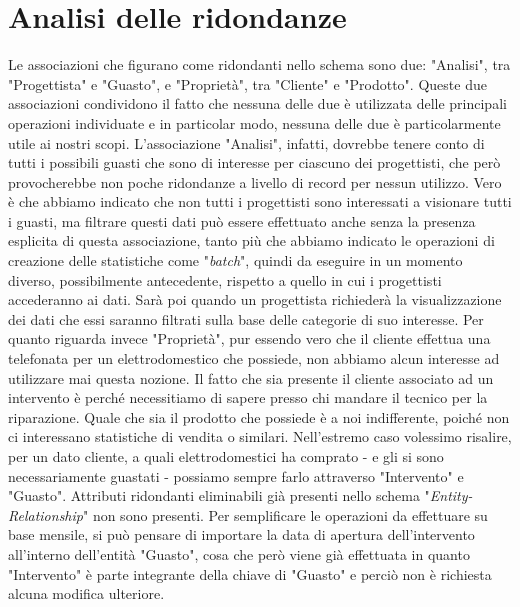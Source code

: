 \documentclass[a4paper, 12pt]{report}
\begin{document}
\section{Analisi delle ridondanze}

Le associazioni che figurano come ridondanti nello schema sono due: "Analisi", tra "Progettista" e "Guasto", e "Proprietà", tra "Cliente" e "Prodotto". Queste due associazioni
condividono il fatto che nessuna delle due è utilizzata delle principali operazioni individuate e in particolar modo, nessuna delle due è particolarmente utile ai nostri scopi.\newline
L'associazione "Analisi", infatti, dovrebbe tenere conto di tutti i possibili guasti che sono di interesse per ciascuno dei progettisti, che però provocherebbe non poche ridondanze
a livello di record per nessun utilizzo. Vero è che abbiamo indicato che non tutti i progettisti sono interessati a visionare tutti i guasti, ma filtrare questi dati può essere effettuato
anche senza la presenza esplicita di questa associazione, tanto più che abbiamo indicato le operazioni di creazione delle statistiche come "\textit{batch}", quindi da eseguire in
un momento diverso, possibilmente antecedente, rispetto a quello in cui i progettisti accederanno ai dati. Sarà poi quando un progettista richiederà la visualizzazione dei dati che
essi saranno filtrati sulla base delle categorie di suo interesse.\newline
Per quanto riguarda invece "Proprietà", pur essendo vero che il cliente effettua una telefonata per un elettrodomestico che possiede, non abbiamo alcun interesse ad utilizzare mai
questa nozione. Il fatto che sia presente il cliente associato ad un intervento è perché necessitiamo di sapere presso chi mandare il tecnico per la riparazione. Quale che sia il prodotto
che possiede è a noi indifferente, poiché non ci interessano statistiche di vendita o similari. Nell'estremo caso volessimo risalire, per un dato cliente, a quali elettrodomestici
ha comprato - e gli si sono necessariamente guastati - possiamo sempre farlo attraverso "Intervento" e "Guasto".\newline
Attributi ridondanti eliminabili già presenti nello schema "\textit{Entity-Relationship}" non sono presenti. Per semplificare le operazioni da effettuare su base mensile, si può pensare di importare la data di apertura dell'intervento all'interno dell'entità "Guasto", cosa che però viene già effettuata in quanto "Intervento" è parte integrante della chiave di "Guasto" e perciò
non è richiesta alcuna modifica ulteriore.\newline
\end{document}
